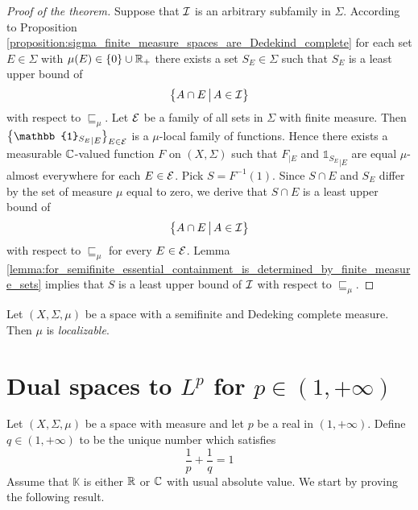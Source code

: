 \begin{proof}[Proof of the theorem]
  Suppose that ${\mathcal I}$ is an arbitrary subfamily in $\Sigma$. According to Proposition \ref{proposition:sigma_finite_measure_spaces_are_Dedekind_complete} for each set $E \in \Sigma$ with $\mu(E) \in \{0\}\cup {\mathbb R}_+$ there exists a set $S_{E} \in \Sigma$ such that $S_{E}$ is a least upper bound of 
  $$\big\{A\cap E\,\big|\,A\in {\mathcal I}\big\}$$
  with respect to $\sqsubseteq_{\mu}$. Let ${\mathcal E}$ be a family of all sets in $\Sigma$ with finite measure. Then $\big\{{\mathbb{1}_{S_{E}}}_{\mid E}\big\}_{E \in \cE}$ is a $\mu$-local family of functions. Hence there exists a measurable ${\mathbb C}$-valued function $F$ on $(X,\Sigma)$ such that $F_{\mid E}$ and ${\mathbb{1}_{S_{E}}}_{\mid E}$ are equal $\mu$-almost everywhere for each $E \in {\mathcal E}$. Pick $S = F^{-1}(1)$. Since $S \cap E$ and $S_{E}$ differ by the set of measure $\mu$ equal to zero, we derive that $S \cap E$ is a least upper bound of $$\big\{A\cap E\,\big|\,A\in {\mathcal I}\big\}$$
  with respect to $\sqsubseteq_{\mu}$ for every $E \in {\mathcal E}$. Lemma \ref{lemma:for_semifinite_essential_containment_is_determined_by_finite_measure_sets} implies that $S$ is a least upper bound of ${\mathcal I}$ with respect to $\sqsubseteq_{\mu}$.
\end{proof}

\begin{definition}
  Let $(X,\Sigma,\mu)$ be a space with a semifinite and Dedeking complete measure. Then $\mu$ is \textit{localizable}.
\end{definition}


\section{Dual spaces to $L^p$ for $p \in (1,+\infty)$}
\noindent
Let $(X,\Sigma,\mu)$ be a space with measure and let $p$ be a real in $(1,+\infty)$. Define $q \in (1,+\infty)$ to be the unique number which satisfies
$$\frac{1}{p} + \frac{1}{q} = 1$$
Assume that $\mathbb{K}$ is either ${\mathbb R}$ or ${\mathbb C}$ with usual absolute value. We start by proving the following result.

